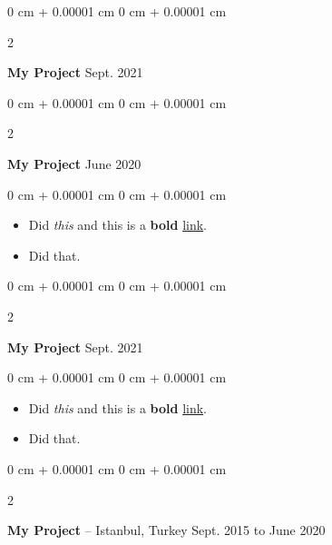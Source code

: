 \documentclass[10pt, letterpaper]{article}
\newenvironment{highlights}{
    \begin{itemize}[
        topsep=0.10 cm,
        parsep=0.10 cm,
        partopsep=0pt,
        itemsep=0pt,
        leftmargin=0 cm + 10pt
    ]
}{
    \end{itemize}
        
    \vspace{-0.10cm}
} %
\newenvironment{onecolentry}{
    \begin{adjustwidth}{
        0 cm + 0.00001 cm
    }{
        0 cm + 0.00001 cm
    }
}{
    \end{adjustwidth}
} %
\newenvironment{twocolentry}[2][]{
    \onecolentry
    \def\secondColumn{#2}
    \setcolumnwidth{\fill, 4.1 cm}
    \begin{paracol}{2}
}{
    \switchcolumn \raggedleft \secondColumn
    \end{paracol}
    \endonecolentry
} %
\begin{document}
        \vspace{0.15 cm}

        \begin{twocolentry}{
            Sept. 2021
        }
            \textbf{My Project}\end{twocolentry}

        \vspace{0.10 cm}


        \vspace{0.15 cm}

        \begin{twocolentry}{
            June 2020
        }
            \textbf{My Project}\end{twocolentry}

        \vspace{0.10 cm}
        \begin{onecolentry}
            \begin{highlights}
                \item Did \textit{this} and this is a \textbf{bold} \href{https://example.com}{link}.
                \item Did that.
            \end{highlights}
        \end{onecolentry}


        \vspace{0.15 cm}

        \begin{twocolentry}{
            Sept. 2021
        }
            \textbf{My Project}\end{twocolentry}

        \vspace{0.10 cm}
        \begin{onecolentry}
            \begin{highlights}
                \item Did \textit{this} and this is a \textbf{bold} \href{https://example.com}{link}.
                \item Did that.
            \end{highlights}
        \end{onecolentry}


        \vspace{0.15 cm}

        \begin{twocolentry}{
            Sept. 2015 to June 2020
        }
            \textbf{My Project} -- Istanbul, Turkey\end{twocolentry}
\end{document}
